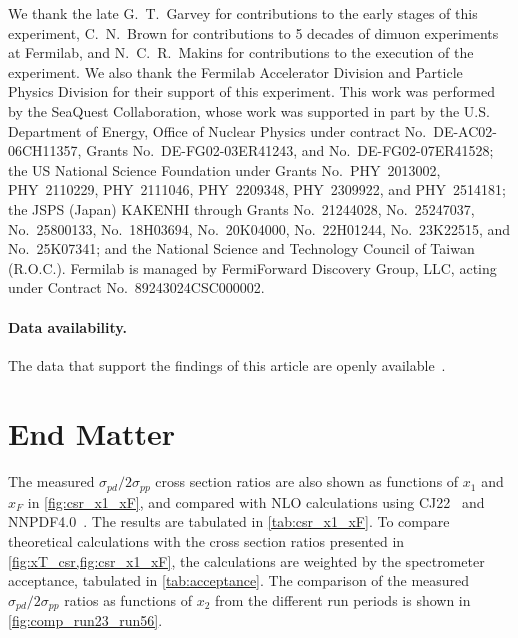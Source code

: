 \documentclass[reprint,aps,unsortedaddress,superscriptaddress,prl,floatfix,showpacs,linenumbers]{revtex4-2}
\begin{document}
\begin{acknowledgments}
	We thank the late G.~T.~Garvey for contributions to the early stages of this experiment, %
	C.~N.~Brown for contributions to 5 decades of dimuon experiments at Fermilab, %
	and N.~C.~R.~Makins for contributions to the execution of the experiment. %
	We also thank the Fermilab Accelerator Division and Particle Physics Division for their support of this experiment. %
	This work was performed by the SeaQuest Collaboration, whose work was supported in part by the
	U.S. Department of Energy, Office of Nuclear Physics under contract
	No.\ DE-AC02-06CH11357, %
	Grants No.\ DE-FG02-03ER41243, %
	and No.\ DE-FG02-07ER41528; %
	the US National Science Foundation under Grants No.\
	PHY\ 2013002, %
	PHY\ 2110229, %
	PHY\ 2111046, %
	PHY\ 2209348, %
	PHY\ 2309922, %
	and PHY\ 2514181; %
	the JSPS (Japan) KAKENHI through Grants No.\ 21244028, No.\ 25247037, No.\ 25800133, No.\ 18H03694, No.\ 20K04000, No.\ 22H01244, No.\ 23K22515, and No.\ 25K07341; %
	and the National Science and Technology Council of Taiwan (R.O.C.). %
	Fermilab is managed by FermiForward Discovery Group, LLC, acting under Contract No.\ 89243024CSC000002. %
\end{acknowledgments}

\paragraph{Data availability.}
The data that support the findings of this article are openly available~\cite{hepdata}.



\clearpage
\appendix
\onecolumngrid
\section{End Matter}
The measured $\sigma_{pd}/2\sigma_{pp}$ cross section ratios are also shown as functions of $x_1$ and $x_F$ in \cref{fig:csr_x1_xF}, 
and compared with NLO calculations using CJ22~\cite{accardi2023} and NNPDF4.0~\cite{ball2022a}. 
The results are tabulated in \cref{tab:csr_x1_xF}. 
To compare theoretical calculations with the cross section ratios presented in \cref{fig:xT_csr,fig:csr_x1_xF},
the calculations are weighted by the spectrometer acceptance, tabulated in \cref{tab:acceptance}.
The comparison of the measured $\sigma_{pd}/2\sigma_{pp}$ ratios as functions of $x_2$ from the different run periods is shown in \cref{fig:comp_run23_run56}.
\end{document}
